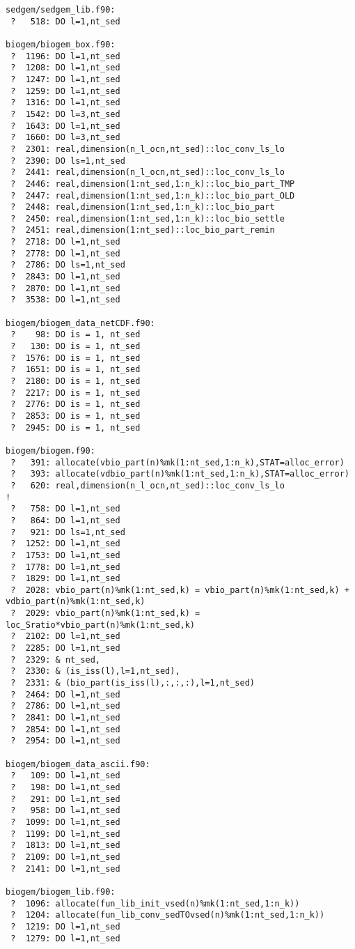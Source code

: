 \documentclass[a4paper,10pt,article]{memoir}
\begin{document}
\begin{small}
\begin{verbatim}
sedgem/sedgem_lib.f90:
 ?   518: DO l=1,nt_sed

biogem/biogem_box.f90:
 ?  1196: DO l=1,nt_sed
 ?  1208: DO l=1,nt_sed
 ?  1247: DO l=1,nt_sed
 ?  1259: DO l=1,nt_sed
 ?  1316: DO l=1,nt_sed
 ?  1542: DO l=3,nt_sed
 ?  1643: DO l=1,nt_sed
 ?  1660: DO l=3,nt_sed
 ?  2301: real,dimension(n_l_ocn,nt_sed)::loc_conv_ls_lo
 ?  2390: DO ls=1,nt_sed
 ?  2441: real,dimension(n_l_ocn,nt_sed)::loc_conv_ls_lo
 ?  2446: real,dimension(1:nt_sed,1:n_k)::loc_bio_part_TMP
 ?  2447: real,dimension(1:nt_sed,1:n_k)::loc_bio_part_OLD
 ?  2448: real,dimension(1:nt_sed,1:n_k)::loc_bio_part
 ?  2450: real,dimension(1:nt_sed,1:n_k)::loc_bio_settle
 ?  2451: real,dimension(1:nt_sed)::loc_bio_part_remin
 ?  2718: DO l=1,nt_sed
 ?  2778: DO l=1,nt_sed
 ?  2786: DO ls=1,nt_sed
 ?  2843: DO l=1,nt_sed
 ?  2870: DO l=1,nt_sed
 ?  3538: DO l=1,nt_sed

biogem/biogem_data_netCDF.f90:
 ?    98: DO is = 1, nt_sed
 ?   130: DO is = 1, nt_sed
 ?  1576: DO is = 1, nt_sed
 ?  1651: DO is = 1, nt_sed
 ?  2180: DO is = 1, nt_sed
 ?  2217: DO is = 1, nt_sed
 ?  2776: DO is = 1, nt_sed
 ?  2853: DO is = 1, nt_sed
 ?  2945: DO is = 1, nt_sed

biogem/biogem.f90:
 ?   391: allocate(vbio_part(n)%mk(1:nt_sed,1:n_k),STAT=alloc_error)
 ?   393: allocate(vdbio_part(n)%mk(1:nt_sed,1:n_k),STAT=alloc_error)
 ?   620: real,dimension(n_l_ocn,nt_sed)::loc_conv_ls_lo                !
 ?   758: DO l=1,nt_sed
 ?   864: DO l=1,nt_sed
 ?   921: DO ls=1,nt_sed
 ?  1252: DO l=1,nt_sed
 ?  1753: DO l=1,nt_sed
 ?  1778: DO l=1,nt_sed
 ?  1829: DO l=1,nt_sed
 ?  2028: vbio_part(n)%mk(1:nt_sed,k) = vbio_part(n)%mk(1:nt_sed,k) + vdbio_part(n)%mk(1:nt_sed,k)
 ?  2029: vbio_part(n)%mk(1:nt_sed,k) = loc_Sratio*vbio_part(n)%mk(1:nt_sed,k)
 ?  2102: DO l=1,nt_sed
 ?  2285: DO l=1,nt_sed
 ?  2329: & nt_sed,
 ?  2330: & (is_iss(l),l=1,nt_sed),
 ?  2331: & (bio_part(is_iss(l),:,:,:),l=1,nt_sed)
 ?  2464: DO l=1,nt_sed
 ?  2786: DO l=1,nt_sed
 ?  2841: DO l=1,nt_sed
 ?  2854: DO l=1,nt_sed
 ?  2954: DO l=1,nt_sed

biogem/biogem_data_ascii.f90:
 ?   109: DO l=1,nt_sed
 ?   198: DO l=1,nt_sed
 ?   291: DO l=1,nt_sed
 ?   958: DO l=1,nt_sed
 ?  1099: DO l=1,nt_sed
 ?  1199: DO l=1,nt_sed
 ?  1813: DO l=1,nt_sed
 ?  2109: DO l=1,nt_sed
 ?  2141: DO l=1,nt_sed

biogem/biogem_lib.f90:
 ?  1096: allocate(fun_lib_init_vsed(n)%mk(1:nt_sed,1:n_k))
 ?  1204: allocate(fun_lib_conv_sedTOvsed(n)%mk(1:nt_sed,1:n_k))
 ?  1219: DO l=1,nt_sed
 ?  1279: DO l=1,nt_sed


\end{verbatim}
\end{small}
\end{document}
